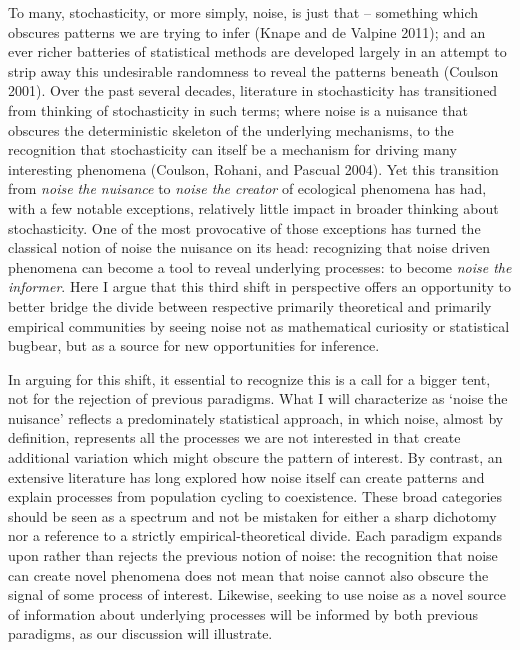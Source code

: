 \documentclass[3p]{elsarticle} %
\begin{document}
To many, stochasticity, or more simply, noise, is just that -- something
which obscures patterns we are trying to infer (Knape and de Valpine
2011); and an ever richer batteries of statistical methods are developed
largely in an attempt to strip away this undesirable randomness to
reveal the patterns beneath (Coulson 2001). Over the past several
decades, literature in stochasticity has transitioned from thinking of
stochasticity in such terms; where noise is a nuisance that obscures the
deterministic skeleton of the underlying mechanisms, to the recognition
that stochasticity can itself be a mechanism for driving many
interesting phenomena (Coulson, Rohani, and Pascual 2004). Yet this
transition from \emph{noise the nuisance} to \emph{noise the creator} of
ecological phenomena has had, with a few notable exceptions, relatively
little impact in broader thinking about stochasticity. One of the most
provocative of those exceptions has turned the classical notion of noise
the nuisance on its head: recognizing that noise driven phenomena can
become a tool to reveal underlying processes: to become \emph{noise the
informer}. Here I argue that this third shift in perspective offers an
opportunity to better bridge the divide between respective primarily
theoretical and primarily empirical communities by seeing noise not as
mathematical curiosity or statistical bugbear, but as a source for new
opportunities for inference.

In arguing for this shift, it essential to recognize this is a call for
a bigger tent, not for the rejection of previous paradigms. What I will
characterize as `noise the nuisance' reflects a predominately
statistical approach, in which noise, almost by definition, represents
all the processes we are not interested in that create additional
variation which might obscure the pattern of interest. By contrast, an
extensive literature has long explored how noise itself can create
patterns and explain processes from population cycling to coexistence.
These broad categories should be seen as a spectrum and not be mistaken
for either a sharp dichotomy nor a reference to a strictly
empirical-theoretical divide. Each paradigm expands upon rather than
rejects the previous notion of noise: the recognition that noise can
create novel phenomena does not mean that noise cannot also obscure the
signal of some process of interest. Likewise, seeking to use noise as a
novel source of information about underlying processes will be informed
by both previous paradigms, as our discussion will illustrate.
\end{document}
